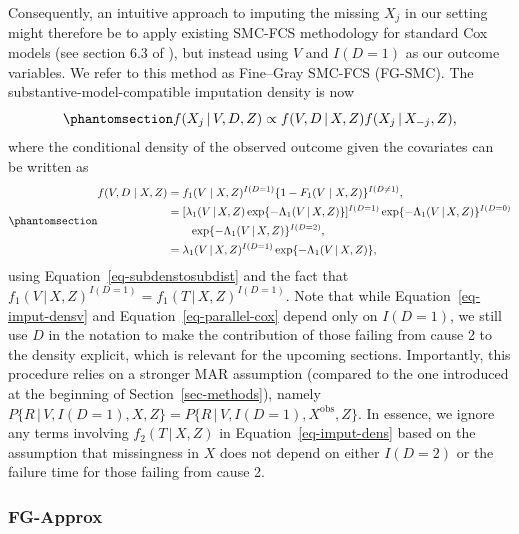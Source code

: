 \documentclass[
  letterpaper,
  paper=240mm:170mm,
  twoside=true,
  open=right,
  fontsize=10pt,
  pagesize=false,
  BCOR=15mm,
  DIV=14,
  headinclude=true,
  footinclude=false,
  headsepline=on]{scrbook}
\newcommand{\given}{\,|\,}
\begin{document}
Consequently, an intuitive approach to imputing the missing \(X_j\) in
our setting might therefore be to apply existing SMC-FCS methodology for
standard Cox models (see section 6.3 of
), but instead using \(V\) and \(I(D = 1)\) as our
outcome variables. We refer to this method as Fine--Gray SMC-FCS
(FG-SMC). The substantive-model-compatible imputation density is now
\begin{equation}\phantomsection\label{eq-imput-densv}{
f(X_j \given V, D, Z) \propto f(V, D \given X, Z)f(X_j \given X_{-j},Z),
}\end{equation} where the conditional density of the observed outcome
given the covariates can be written as
\begin{equation}\phantomsection\label{eq-parallel-cox}{
\begin{aligned}
    f(V, D \mid X, Z) &= f_1(V \mid X, Z)^{I(D = 1)}\{1 - F_1(V \mid X, Z)\}^{I(D \neq 1)},  \\
    &= [\lambda_1(V \given X, Z)\exp\{- \Lambda_1(V \given X, Z)\}]^{I(D = 1)}\exp\{- \Lambda_1(V \given X, Z)\}^{I(D = 0)}  \\
    &\qquad \exp\{- \Lambda_1(V \given X, Z)\}^{I(D = 2)},   \\
    &= \lambda_1(V \given X, Z)^{I(D = 1)}\exp\{- \Lambda_1(V \given X, Z)\}, 
\end{aligned}
}\end{equation} using Equation~\ref{eq-subdenstosubdist} and the fact
that \(f_1(V \given X, Z)^{I(D = 1)} = f_1(T \given X, Z)^{I(D = 1)}\).
Note that while Equation~\ref{eq-imput-densv} and
Equation~\ref{eq-parallel-cox} depend only on \(I(D = 1)\), we still use
\(D\) in the notation to make the contribution of those failing from
cause 2 to the density explicit, which is relevant for the upcoming
sections. Importantly, this procedure relies on a stronger MAR
assumption (compared to the one introduced at the beginning of
Section~\ref{sec-methods}), namely
\(P\{R \given V, I(D = 1), X, Z\} = P\{R \given V, I(D = 1), X^{\text{obs}}, Z\}\).
In essence, we ignore any terms involving \(f_2(T \given X, Z)\) in
Equation~\ref{eq-imput-dens} based on the assumption that missingness in
\(X\) does not depend on either \(I(D = 2)\) or the failure time for
those failing from cause 2.

\subsubsection{FG-Approx}\label{sec-fg-approx}
\end{document}
